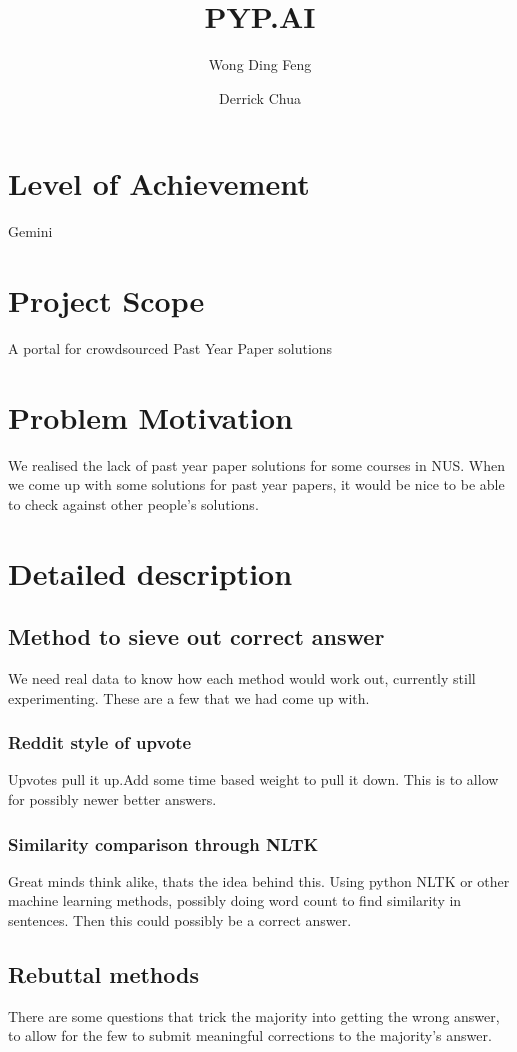\documentclass[36pt]{article}
\author{Wong Ding Feng \and Derrick Chua}
\title{PYP.AI}
\begin{document}
\maketitle
\section{Level of Achievement}
Gemini
\section{Project Scope}
A portal for crowdsourced Past Year Paper solutions
\section{Problem Motivation}
We realised the lack of past year paper solutions for some courses in NUS\@. When we come up with some solutions for past year papers, it would be nice to be able to check against other people's solutions.
\section{Detailed description}
\subsection{Method to sieve out correct answer}
We need real data to know how each method would work out, currently still experimenting. These are a few that we had come up with.
\subsubsection{Reddit style of upvote}
Upvotes pull it up.Add some time based weight to pull it down. This is to allow for possibly newer better answers.
\subsubsection{Similarity comparison through NLTK}
Great minds think alike, thats the idea behind this.
Using python NLTK or other machine learning methods, possibly doing word count to find similarity in sentences. Then this could possibly be a correct answer.
\subsection{Rebuttal methods}
There are some questions that trick the majority into getting the wrong answer, to allow for the few to submit meaningful corrections to the majority's answer. 
\end{document}
